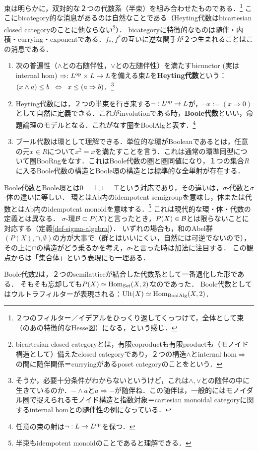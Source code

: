 \documentclass[uplatex, dvipdfmx]{jsreport}
\begin{document}
\begin{definition}
    束は明らかに，双対的な２つの代数系（半束）を組み合わせたものである．\footnote{２つのフィルター／イデアルをひっくり返してくっつけて，全体として束（のあの特徴的なHesse図）になる，という感じ．}
    ここにbicategory的な消息があるのは自然なことである（Heyting代数はbicartesian closed categoryのことに他ならない\footnote{bicartesian closed categoryとは，有限coproductも有限productも（モノイド構造として）備えたclosed categoryであり，２つの構造$\land$とinternal hom$\Rightarrow$の間に随伴関係＝curryingがあるposet categoryのことをという．}）．
    bicategoryに特徴的なものは随伴・内積・currying・exponentである．$f_*,f^*$の互いに逆な関手が２つ生まれることはこの消息である．
    \begin{enumerate}
        \item 次の普遍性（$\land$との右随伴性，$\lor$との左随伴性）を満たすbicunctor (実はinternal hom) $\Rightarrow:L^{\mathrm{op}}\times L\to L$を備える束$L$を\textbf{Heyting代数}という：$(x\land a)\le b\;\;\Leftrightarrow\;\; x\le(a\Rightarrow b)$．\footnote{そうか，必要十分条件がわからないというけど，これは$\land,\lor$との随伴の中に生きているのか．$-\land a$と$a\Rightarrow-$が随伴ね．この随伴は，一般的にはモノイダル圏で捉えられるモノイド構造と指数対象＝cartesian monoidal categoryに関するinternal homとの随伴性の例になっている．}
        \item Heyting代数には，２つの半束を行き来する$\lnot:L^{\mathrm{op}}\to L$が，$\lnot x:=(x\Rightarrow 0)$として自然に定義できる．これがinvolutionである時，\textbf{Boole代数}といい，命題論理のモデルとなる．これがなす圏をBoolAlgと表す．\footnote{任意の束の射は$\lnot:L\to L^{\mathrm{op}}$を保つ．}
        \item ブール代数は環として理解できる．単位的な環がBooleanであるとは，任意の元$x\in R$について$x^2=x$を満たすことを言う．これは通常の環準同型について圏BooRngをなす．これはBoole代数の圏と圏同値になり，１つの集合$R$に入るBoole代数の構造とBoole環の構造とは標準的な全単射が存在する．
    \end{enumerate}
\end{definition}
\begin{remark}
    Boole代数とBoole環とは$0=\bot,1=\top$という対応であり，その違いは，$\sigma$-代数と$\sigma$-体の違いに等しい．
    環とはAb内のidempotent semigroupを意味し，体または代数とはAb内のidempotent monoidを意味する．\footnote{半束もidempotent monoidのことであると理解できる．}
    これは現代的な環・体・代数の定義とは異なる．
    $\sigma$-環$\mathcal{B}\subset P(X)$と言ったとき，$P(X)\in\mathcal{B}$とは限らないことに対応する（定義\ref{def-sigma-algebra}）．
    いずれの場合も，和のAbel群$(P(X),\cap,\emptyset)$の方が大事で（群とはいいにくい，自然には可逆でないので），
    その上に$\cap$の構造がどう乗るかを考え，$\sigma$-と言った時は加法に注目する．
    この観点からは「集合体」という表現にも一理ある．
\end{remark}
\begin{remark}
    Boole代数$2$は，２つのsemilatticeが結合した代数系として一番退化した形である．
    そもそも忘却しても$P(X)\simeq\mathrm{Hom}_{\mathrm{Set}}(X,2)$なのであった．
    Boole代数としてはウルトラフィルターが表現される：$\mathrm{Ult}(X)\simeq\mathrm{Hom}_{\mathrm{BoolAlg}}(X,2)$．
\end{remark}
\end{document}
